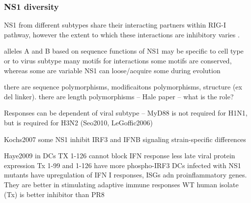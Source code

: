 		
		
		
		\subsubsection{NS1 diversity}
		
		NS1 from different subtypes share their interacting partners within \gls{RIG-I} pathway, however the extent to which these interactions are inhibitory varies \parencite{Kochs2007, Haye2009, Munir2011a, Munir2012}.
		
		alleles A and B based on sequence
		functions of NS1 may be specific to cell type or to virus subtype
		many motifs for interactions 
		some motifs are conserved, whereas some are variable
		NS1 can loose/acquire some during evolution
		
		there are sequence polymorphisms, modificaitons polymorphisms, structure (ex del linker). there are length polymorphisms -- Hale paper -- what is the role?
		
		Responses can be dependent of viral subtype -- MyD88 is not required for H1N1, but is required for H3N2 (Seo2010, LeGoffic2006)
		
		Kochs2007
		some NS1 inhibit IRF3 and IFNB signaling
		strain-specific differences
		
		Haye2009
		in DCs
		TX 1-126 cannot block IFN response
		less late viral protein expression
		Tx 1-99 and 1-126 have more phospho-IRF3
		DCs infected with NS1 mutants have upregulation of IFN I responses, ISGs adn proinflammatory genes. They are better in stimulating adaptive immune responses
		WT human isolate (Tx) is better inhibitor than PR8
				
		
